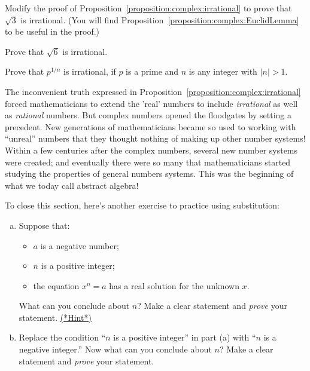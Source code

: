 \begin{exercise}\label{exercise:complex:4}
Modify the proof of Proposition~\ref{proposition:complex:irrational} to prove that $\sqrt{3}$ is irrational. (You will find Proposition~\ref{proposition:complex:EuclidLemma} to be useful in the proof.)
\end{exercise}

\begin{exercise}\label{exercise:complex:5}
Prove that $\sqrt{6}$ is irrational.
\end{exercise}

\begin{exercise}\label{exercise:complex:6}
Prove that $p^{1/n}$ is irrational, if $p$ is a prime and $n$ is any integer with $|n|>1$.
\end{exercise}

The inconvenient truth expressed in Proposition~\ref{proposition:complex:irrational} forced mathematicians to extend
the 'real' numbers to include \emph{irrational} as well as \emph{rational}
numbers. But complex numbers opened the floodgates by setting a precedent. New generations of mathematicians 
became so used to working with ``unreal'' numbers that they thought nothing of making up other number systems!
Within a few centuries after the complex numbers, several new
number systems were created; and eventually there were so many 
that mathematicians started studying the properties of general numbers
systems. This was the beginning of what we today call  abstract
algebra!

To close this section, here's another exercise to practice using substitution:

\begin{exercise}\label{exercise:complex:root3}
\begin{enumerate}[(a)]
\item
Suppose that:
\begin{itemize}
\item
$a$ is a negative number;
\item
$n$ is a positive integer;
\item
the equation $x^n = a$ has a real solution for the unknown $x$.
\end{itemize}
What can you conclude about $n$? Make a clear statement and \emph{prove} your statement.
\hyperref[sec:complex:hints]{(*Hint*)}

\item
Replace the condition ``$n$ is a positive integer'' in part (a) with ``$n$ is a negative integer.'' Now what can you conclude about $n$? Make a clear statement and \emph{prove} your statement.
\end{enumerate}
\end{exercise}


